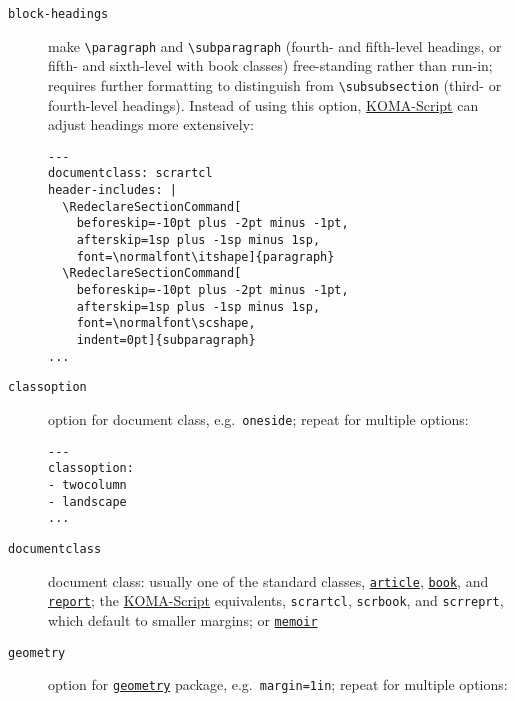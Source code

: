 \documentclass[
]{article}
\begin{document}
\begin{description}
\item[\texttt{block-headings}]
make \texttt{\textbackslash{}paragraph} and
\texttt{\textbackslash{}subparagraph} (fourth- and fifth-level headings,
or fifth- and sixth-level with book classes) free-standing rather than
run-in; requires further formatting to distinguish from
\texttt{\textbackslash{}subsubsection} (third- or fourth-level
headings). Instead of using this option,
\href{https://ctan.org/pkg/koma-script}{KOMA-Script} can adjust headings
more extensively:

\begin{verbatim}
---
documentclass: scrartcl
header-includes: |
  \RedeclareSectionCommand[
    beforeskip=-10pt plus -2pt minus -1pt,
    afterskip=1sp plus -1sp minus 1sp,
    font=\normalfont\itshape]{paragraph}
  \RedeclareSectionCommand[
    beforeskip=-10pt plus -2pt minus -1pt,
    afterskip=1sp plus -1sp minus 1sp,
    font=\normalfont\scshape,
    indent=0pt]{subparagraph}
...
\end{verbatim}
\item[\texttt{classoption}]
option for document class, e.g.~\texttt{oneside}; repeat for multiple
options:

\begin{verbatim}
---
classoption:
- twocolumn
- landscape
...
\end{verbatim}
\item[\texttt{documentclass}]
document class: usually one of the standard classes,
\href{https://ctan.org/pkg/article}{\texttt{article}},
\href{https://ctan.org/pkg/book}{\texttt{book}}, and
\href{https://ctan.org/pkg/report}{\texttt{report}}; the
\href{https://ctan.org/pkg/koma-script}{KOMA-Script} equivalents,
\texttt{scrartcl}, \texttt{scrbook}, and \texttt{scrreprt}, which
default to smaller margins; or
\href{https://ctan.org/pkg/memoir}{\texttt{memoir}}
\item[\texttt{geometry}]
option for \href{https://ctan.org/pkg/geometry}{\texttt{geometry}}
package, e.g.~\texttt{margin=1in}; repeat for multiple options:


\end{description}
\end{document}
